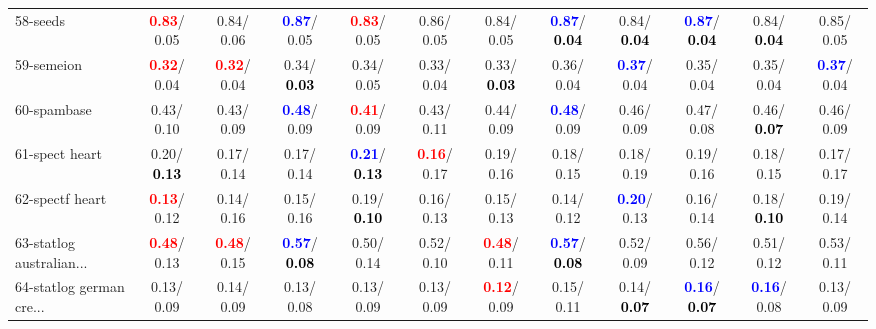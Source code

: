 \begin{table}[h]
\begin{center}
{\begin{tabular}{lc|c|c|c|c|c|c|c|c|c|c}
58-seeds & \textcolor{red}{\textbf{  0.83}}/  0.05 &   0.84/  0.06 & \textcolor{blue}{\textbf{  0.87}}/  0.05 & \textcolor{red}{\textbf{  0.83}}/  0.05 &   0.86/  0.05 &   0.84/  0.05 & \textcolor{blue}{\textbf{  0.87}}/\textcolor{black}{\textbf{  0.04}} &   0.84/\textcolor{black}{\textbf{  0.04}} & \textcolor{blue}{\textbf{  0.87}}/\textcolor{black}{\textbf{  0.04}} &   0.84/\textcolor{black}{\textbf{  0.04}} &   0.85/  0.05 \\
59-semeion & \textcolor{red}{\textbf{  0.32}}/  0.04 & \textcolor{red}{\textbf{  0.32}}/  0.04 &   0.34/\textcolor{black}{\textbf{  0.03}} &   0.34/  0.05 &   0.33/  0.04 &   0.33/\textcolor{black}{\textbf{  0.03}} &   0.36/  0.04 & \textcolor{blue}{\textbf{  0.37}}/  0.04 &   0.35/  0.04 &   0.35/  0.04 & \textcolor{blue}{\textbf{  0.37}}/  0.04 \\
60-spambase &   0.43/  0.10 &   0.43/  0.09 & \textcolor{blue}{\textbf{  0.48}}/  0.09 & \textcolor{red}{\textbf{  0.41}}/  0.09 &   0.43/  0.11 &   0.44/  0.09 & \textcolor{blue}{\textbf{  0.48}}/  0.09 &   0.46/  0.09 &   0.47/  0.08 &   0.46/\textcolor{black}{\textbf{  0.07}} &   0.46/  0.09 \\ \hline
61-spect heart &   0.20/\textcolor{black}{\textbf{  0.13}} &   0.17/  0.14 &   0.17/  0.14 & \textcolor{blue}{\textbf{  0.21}}/\textcolor{black}{\textbf{  0.13}} & \textcolor{red}{\textbf{  0.16}}/  0.17 &   0.19/  0.16 &   0.18/  0.15 &   0.18/  0.19 &   0.19/  0.16 &   0.18/  0.15 &   0.17/  0.17 \\
62-spectf heart & \textcolor{red}{\textbf{  0.13}}/  0.12 &   0.14/  0.16 &   0.15/  0.16 &   0.19/\textcolor{black}{\textbf{  0.10}} &   0.16/  0.13 &   0.15/  0.13 &   0.14/  0.12 & \textcolor{blue}{\textbf{  0.20}}/  0.13 &   0.16/  0.14 &   0.18/\textcolor{black}{\textbf{  0.10}} &   0.19/  0.14 \\
63-statlog australian... & \textcolor{red}{\textbf{  0.48}}/  0.13 & \textcolor{red}{\textbf{  0.48}}/  0.15 & \textcolor{blue}{\textbf{  0.57}}/\textcolor{black}{\textbf{  0.08}} &   0.50/  0.14 &   0.52/  0.10 & \textcolor{red}{\textbf{  0.48}}/  0.11 & \textcolor{blue}{\textbf{  0.57}}/\textcolor{black}{\textbf{  0.08}} &   0.52/  0.09 &   0.56/  0.12 &   0.51/  0.12 &   0.53/  0.11 \\
64-statlog german cre... &   0.13/  0.09 &   0.14/  0.09 &   0.13/  0.08 &   0.13/  0.09 &   0.13/  0.09 & \textcolor{red}{\textbf{  0.12}}/  0.09 &   0.15/  0.11 &   0.14/\textcolor{black}{\textbf{  0.07}} & \textcolor{blue}{\textbf{  0.16}}/\textcolor{black}{\textbf{  0.07}} & \textcolor{blue}{\textbf{  0.16}}/  0.08 &   0.13/  0.09 \\\end{tabular}}\label{stratsALCKappa1aIELMRedux}
\end{center}
\end{table}
